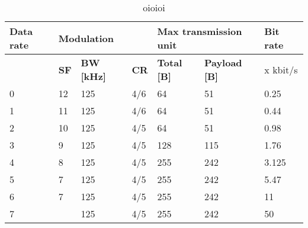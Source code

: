 \begin{table}[h!]
\scriptsize
	\begin{tabular}{l|l|l|l|l|l|l}
	\textbf{Data rate}& \multicolumn{3}{l}{\textbf{Modulation}} &                                 \multicolumn{2}{l}{\textbf{Max transmission unit}}                          & \textbf{Bit rate}  \\\hline
	\                 & \textbf{SF}                               & \textbf{BW [kHz]} & \textbf{CR} & \textbf{Total [B]}                                  & \textbf{Payload [B]} & x kbit/s \\\hline
	0                 & 12                                        & 125               & 4/6         & 64                                                  & 51                   & 0.25     \\\hline
	1                 & 11                                        & 125               & 4/6         & 64                                                  & 51                   & 0.44     \\\hline
	2                 & 10                                        & 125               & 4/5         & 64                                                  & 51                   & 0.98     \\\hline
	3                 & 9                                         & 125               & 4/5         & 128                                                 & 115                  & 1.76     \\\hline
	4                 & 8                                         & 125               & 4/5         & 255                                                 & 242                  & 3.125    \\\hline
	5                 & 7                                         & 125               & 4/5         & 255                                                 & 242                  & 5.47     \\\hline
	6                 & 7                                         & 125               & 4/5         & 255                                                 & 242                  & 11       \\\hline
	7                 &                                           & 125               & 4/5         & 255                                                 & 242                  & 50       \\\hline
	\end{tabular}
\caption{\label{tab:llo}oioioi }
\end{table}

